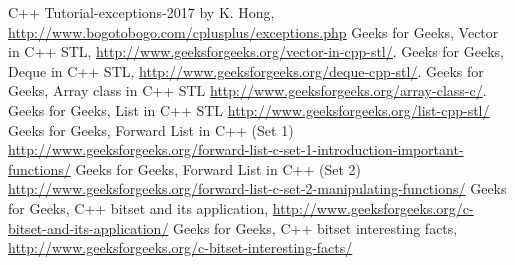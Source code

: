 \begin{thebibliography}{9}
C++ Tutorial-exceptions-2017 by K. Hong, \href{http://www.bogotobogo.com/cplusplus/exceptions.php}{http://www.bogotobogo.com/cplusplus/exceptions.php}
Geeks for Geeks, Vector in C++ STL, \href{http://www.geeksforgeeks.org/vector-in-cpp-stl/}{http://www.geeksforgeeks.org/vector-in-cpp-stl/}.
Geeks for Geeks, Deque in C++ STL, \href{http://www.geeksforgeeks.org/deque-cpp-stl/}{http://www.geeksforgeeks.org/deque-cpp-stl/}.
Geeks for Geeks, Array class in C++ STL \href{http://www.geeksforgeeks.org/array-class-c/}{http://www.geeksforgeeks.org/array-class-c/}.
Geeks for Geeks, List in C++ STL  \href{http://www.geeksforgeeks.org/list-cpp-stl/}{http://www.geeksforgeeks.org/list-cpp-stl/}
Geeks for Geeks, Forward List in C++ (Set 1) \href{http://www.geeksforgeeks.org/forward-list-c-set-1-introduction-important-functions/}{http://www.geeksforgeeks.org/forward-list-c-set-1-introduction-important-functions/}
Geeks for Geeks, Forward List in C++ (Set 2) \href{http://www.geeksforgeeks.org/forward-list-c-set-2-manipulating-functions/}{http://www.geeksforgeeks.org/forward-list-c-set-2-manipulating-functions/}
Geeks for Geeks, C++ bitset and its application, \href{http://www.geeksforgeeks.org/c-bitset-and-its-application/}{http://www.geeksforgeeks.org/c-bitset-and-its-application/}
Geeks for Geeks, C++ bitset interesting facts, \href{http://www.geeksforgeeks.org/c-bitset-interesting-facts/}{http://www.geeksforgeeks.org/c-bitset-interesting-facts/}
\end{thebibliography}

